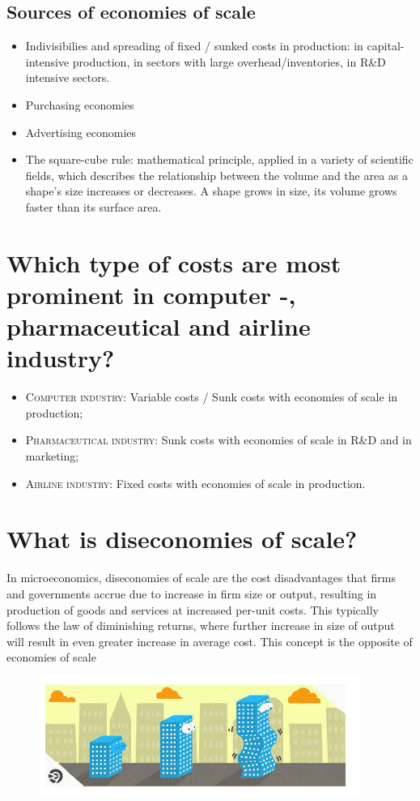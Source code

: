 \subsection{Sources of economies of scale}
\begin{itemize}
\item Indivisibilies and spreading of fixed / sunked costs in production: in capital-intensive production, in sectors with large overhead/inventories, in R\&D intensive sectors.
\item Purchasing economies
\item Advertising economies
\item The square-cube rule: mathematical principle, applied in a variety of scientific fields, which describes the relationship between the volume and the area as a shape's size increases or decreases. A shape grows in size, its volume grows faster than its surface area. 
\end{itemize}

\section{Which type of costs are most prominent in computer -, pharmaceutical and airline industry?}
\begin{itemize}
\item \textsc{Computer industry}: Variable costs / Sunk costs with economies of scale in production;
\item \textsc{Pharmaceutical industry}: Sunk costs with economies of scale in R\&D and in marketing; 
\item \textsc{Airline industry}: Fixed costs with economies of scale in production. 
\end{itemize}

\section{What is diseconomies of scale?}
In microeconomics, diseconomies of scale are the cost disadvantages that firms and governments accrue due to increase in firm size or output, resulting in production of goods and services at increased per-unit costs. This typically follows the law of diminishing returns, where further increase in size of output will result in even greater increase in average cost. This concept is the opposite of economies of scale

\begin{figure}[h]
\begin{center}
\includegraphics{DES}
\end{center}
\end{figure}

